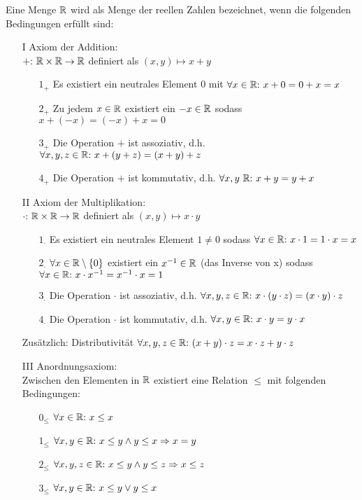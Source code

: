 
	Eine Menge $\mathbb{R}$ wird als Menge der reellen Zahlen bezeichnet, wenn die folgenden Bedingungen erfüllt sind:
	
	\begin{enumerate}
		
		\item[I] Axiom der Addition:\\
		$+{:}\  \mathbb{R} \times \mathbb{R} \to \mathbb{R}$ definiert als $(x, y) \mapsto x+y$
		\begin{enumerate}
			\item [$1_+$] Es existiert ein neutrales Element $0$ mit $\forall x \in \mathbb{R}{:}\  x + 0 = 0 + x = x$
			\item [$2_+$] Zu jedem $x \in \mathbb{R}$ existiert ein $-x \in \mathbb{R}$ sodass $x + (-x) = (-x) + x = 0$
			\item [$3_+$] Die Operation $+$ ist assoziativ, d.h. $\forall x,y,z \in \mathbb{R}{:}\  x+(y+z) = (x+y)+z$
			\item [$4_+$] Die Operation $+$ ist kommutativ, d.h. $\forall x,y \ \mathbb{R}{:}\  x + y = y + x$
		\end{enumerate}
	
		\item [II] Axiom der Multiplikation:\\
		$\cdot{:}\  \mathbb{R} \times \mathbb{R} \to \mathbb{R}$ definiert als $(x,y) \mapsto x\cdot y$
		\begin{enumerate}
			\item [$1_\cdot$] Es existiert ein neutrales Element $1\neq 0$ sodass $\forall x \in \mathbb{R}{:}\  x\cdot 1 = 1 \cdot x = x$
			\item [$2_\cdot$] $\forall x \in \mathbb{R} \setminus \{0\}$ existiert ein $x^{-1} \in \mathbb{R}$ (das Inverse von x) sodass \newline $\forall x \in \mathbb{R}{:}\  x \cdot x^{-1} = x ^ {-1} \cdot x = 1$
			\item [$3_\cdot$] Die Operation $\cdot$ ist assoziativ, d.h. $\forall x,y,z \in \mathbb{R}{:}\  x\cdot (y\cdot z) = (x\cdot y) \cdot z$
			\item [$4_\cdot$] Die Operation $\cdot$ ist kommutativ, d.h. $\forall x,y \in \mathbb{R}{:}\  x\cdot y = y\cdot x$
		\end{enumerate}
	
		\item[ ] Zusätzlich: Distributivität $\forall x,y,z \in \mathbb{R}{:}\  (x+y) \cdot z = x\cdot z + y\cdot z$
		
		\item [III] Anordnungsaxiom:\\
		Zwischen den Elementen in $\mathbb{R}$ existiert eine Relation $\leq$ mit folgenden Bedingungen:
		\begin{enumerate}
			\item [$0_\leq$] $\forall x \in \mathbb{R}{:}\  x \leq x$
			\item [$1_\leq$] $\forall x,y \in \mathbb{R}{:}\  x \leq y \land y \leq x \Rightarrow x = y$
			\item [$2_\leq$] $\forall x,y,z \in \mathbb{R}{:}\  x \leq y \land y \leq z \Rightarrow x \leq z$
			\item [$3_\leq$] $\forall x,y \in \mathbb{R}{:}\  x \leq y \lor y \leq x$
		\end{enumerate}
	

\end{enumerate}
